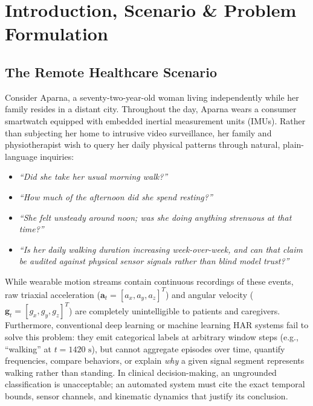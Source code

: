 \documentclass[11pt,a4paper]{article}
\begin{document}
\vspace{0.8em}

\section{Introduction, Scenario \& Problem Formulation}
\label{sec:intro}

\subsection{The Remote Healthcare Scenario}
Consider Aparna, a seventy-two-year-old woman living independently while her family resides in a distant city. Throughout the day, Aparna wears a consumer smartwatch equipped with embedded inertial measurement units (IMUs). Rather than subjecting her home to intrusive video surveillance, her family and physiotherapist wish to query her daily physical patterns through natural, plain-language inquiries:
\begin{itemize}[noitemsep,topsep=1pt]
  \item \textit{``Did she take her usual morning walk?''}
  \item \textit{``How much of the afternoon did she spend resting?''}
  \item \textit{``She felt unsteady around noon; was she doing anything strenuous at that time?''}
  \item \textit{``Is her daily walking duration increasing week-over-week, and can that claim be audited against physical sensor signals rather than blind model trust?''}
\end{itemize}

While wearable motion streams contain continuous recordings of these events, raw triaxial acceleration ($\mathbf{a}_t = [a_x, a_y, a_z]^T$) and angular velocity ($\mathbf{g}_t = [g_x, g_y, g_z]^T$) are completely unintelligible to patients and caregivers. Furthermore, conventional deep learning or machine learning HAR systems fail to solve this problem: they emit categorical labels at arbitrary window steps (e.g., ``walking'' at $t = 1420\text{ s}$), but cannot aggregate episodes over time, quantify frequencies, compare behaviors, or explain \textit{why} a given signal segment represents walking rather than standing. In clinical decision-making, an ungrounded classification is unacceptable; an automated system must cite the exact temporal bounds, sensor channels, and kinematic dynamics that justify its conclusion.
\end{document}
